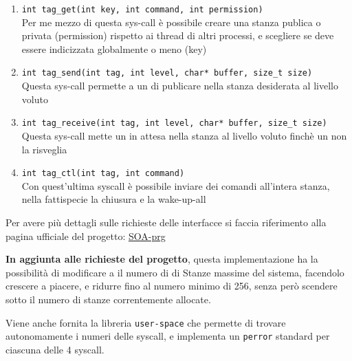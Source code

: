 \begin{enumerate}
    \item \verb|int tag_get(int key, int command, int permission)|\\
    Per me mezzo di questa sys-call è possibile creare una stanza publica o privata (permission)
    rispetto ai thread di altri processi, e scegliere se deve essere indicizzata globalmente o meno (key)
    \item \verb|int tag_send(int tag, int level, char* buffer, size_t size)|\\
    Questa sys-call permette a un \Writer di publicare nella stanza desiderata al livello voluto
    \item \verb|int tag_receive(int tag, int level, char* buffer, size_t size)|\\
    Questa sys-call mette un \Reader in attesa nella stanza al livello voluto finchè un \Writer non la risveglia
    \item \verb|int tag_ctl(int tag, int command)|\\
    Con quest'ultima syscall è possibile inviare dei comandi all'intera stanza, nella fattispecie la chiusura e la
wake-up-all
\end{enumerate}
Per avere più dettagli sulle richieste delle interfacce si faccia riferimento alla pagina ufficiale del progetto:
\href{https://francescoquaglia.github.io/TEACHING/AOS/PROJECTS/project-specification-2020-2021.html}{SOA-prg}

\textbf{In aggiunta alle richieste del progetto}, questa implementazione ha la possibilità di modificare a
\RunTime il numero di di Stanze massime del sistema, facendolo crescere a piacere, e ridurre fino al numero minimo di
256, senza però scendere sotto il numero di stanze correntemente allocate.


Viene anche fornita la libreria \texttt{user-space} che permette di trovare autonomamente i numeri delle syscall, e
implementa un \texttt{perror} standard per ciascuna delle 4 syscall.
